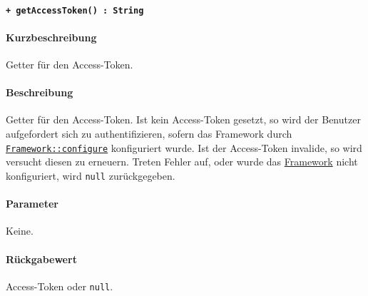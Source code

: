 \paragraph{\texttt{+ getAccessToken() : String}}\label{AP_Framework_getAccessToken}%
\paragraph*{Kurzbeschreibung}
Getter für den Access-Token.
\paragraph*{Beschreibung}
Getter für den Access-Token.
Ist kein Access-Token gesetzt, so wird der Benutzer aufgefordert sich zu authentifizieren, sofern das Framework durch \hyperref[AP_Framework_configure]{\texttt{Framework::configure}} konfiguriert wurde.
Ist der Access-Token invalide, so wird versucht diesen zu erneuern.
Treten Fehler auf, oder wurde das \hyperref[AP_Framework]{Framework} nicht konfiguriert, wird \verb#null# zurückgegeben.
\paragraph*{Parameter}
Keine.
\paragraph*{Rückgabewert}
Access-Token oder \verb#null#.